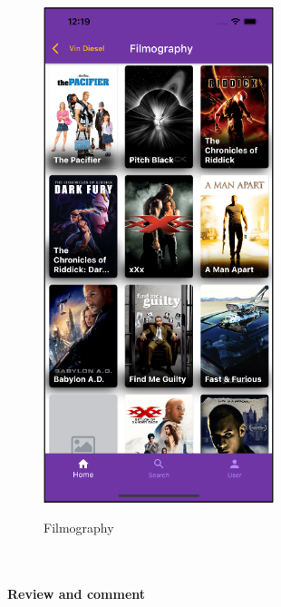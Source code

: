 \documentclass[12pt, a4paper]{article}
\numberwithin{figure}{section}
\begin{document}
\begin{center}
\begin{minipage}[t]{0.4\textwidth}
\begin{figure}[H]
			\includegraphics[width=0.6\textwidth]{images/final/filmography.png}\\
			\caption{Filmography}
		\end{figure}
	\end{minipage}
\end{center}

\mbox{}\\

\paragraph{Review and comment}
\end{document}
